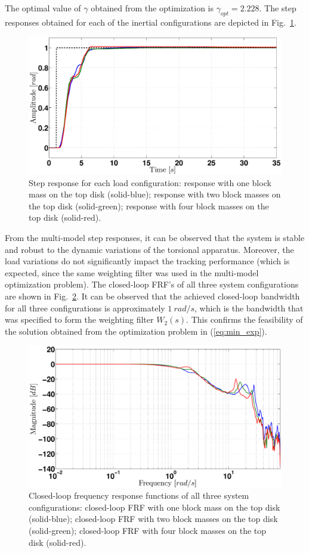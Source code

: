 \documentclass[a4paper, 10pt, conference]{ieeeconf}
\begin{document}
The optimal value of $\gamma$ obtained from the optimization is $\gamma_{opt} = 2.228$. The step responses obtained for each of the inertial configurations are depicted in Fig.~\ref{fig:step}. 
\begin{figure}
\centering
\includegraphics[width=\columnwidth]{pics/step_2}
\caption{Step response for each load configuration: response with one block mass on the top disk (solid-blue); response with two block masses on the top disk (solid-green); response with four block masses on the top disk (solid-red). }
\label{fig:step}
\end{figure}
From the multi-model step responses, it can be observed that the system is stable and robust to the dynamic variations of the torsional apparatus. Moreover, the load variations do not significantly impact the tracking performance (which is expected, since the same weighting filter was used in the multi-model optimization problem). The closed-loop FRF's of all three system configurations are shown in Fig.~\ref{fig:CL}. It can be observed that the achieved closed-loop bandwidth for all three configurations is approximately $1 \ rad/s$, which is the bandwidth that was specified to form the weighting filter $W_2(s)$. This confirms the feasibility of the solution obtained from the optimization problem in (\ref{eq:min_exp}).
\begin{figure}
\centering
\includegraphics[width=\columnwidth]{pics/closed_loop}
\caption{Closed-loop frequency response functions of all three system configurations: closed-loop FRF with one block mass on the top disk (solid-blue); closed-loop FRF with two block masses on the top disk (solid-green); closed-loop FRF with four block masses on the top disk (solid-red).}
\label{fig:CL}
\end{figure}
\end{document}
